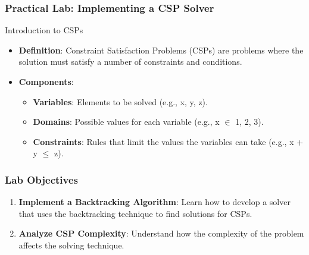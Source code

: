 \documentclass[aspectratio=169]{beamer}
\begin{document}
\begin{frame}
    \frametitle{Practical Lab: Implementing a CSP Solver}
    \begin{block}{Introduction to CSPs}
        \begin{itemize}
            \item \textbf{Definition}: Constraint Satisfaction Problems (CSPs) are problems where the solution must satisfy a number of constraints and conditions.
            \item \textbf{Components}:
                \begin{itemize}
                    \item \textbf{Variables}: Elements to be solved (e.g., x, y, z).
                    \item \textbf{Domains}: Possible values for each variable (e.g., x $\in$ {1, 2, 3}).
                    \item \textbf{Constraints}: Rules that limit the values the variables can take (e.g., x + y $\leq$ z).
                \end{itemize}
        \end{itemize}
    \end{block}
\end{frame}

\begin{frame}
    \frametitle{Lab Objectives}
    \begin{enumerate}
        \item \textbf{Implement a Backtracking Algorithm}: Learn how to develop a solver that uses the backtracking technique to find solutions for CSPs.
        \item \textbf{Analyze CSP Complexity}: Understand how the complexity of the problem affects the solving technique.
    \end{enumerate}
\end{frame}
\end{document}
